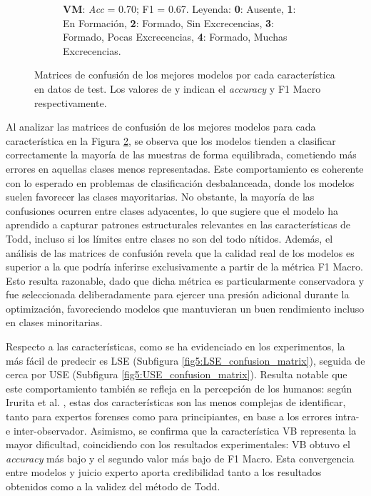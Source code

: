 \begin{figure}[htbp]
\begin{subfigure}[t]{0.3\textwidth}
        \caption{\textbf{VM}: \textit{Acc} = 0.70; F1 = 0.67. Leyenda: \textbf{0}: Ausente, \textbf{1}: En Formación, \textbf{2}: Formado, Sin Excrecencias, \textbf{3}: Formado, Pocas Excrecencias, \textbf{4}: Formado, Muchas Excrecencias.}
        \label{fig5:VM_confusion_matrix}
    \end{subfigure}  
    \caption[Matrices de confusión de los mejores modelos en datos de test]{Matrices de confusión de los mejores modelos por cada característica en datos de test. Los valores de  y  indican el \textit{accuracy} y F1 Macro respectivamente.}
    \label{conf_matrices}
\end{figure}


Al analizar las matrices de confusión de los mejores modelos para cada característica en la Figura \ref{conf_matrices}, se observa que los modelos tienden a clasificar correctamente la mayoría de las muestras de forma equilibrada, cometiendo más errores en aquellas clases menos representadas. Este comportamiento es coherente con lo esperado en problemas de clasificación desbalanceada, donde los modelos suelen favorecer las clases mayoritarias. No obstante, la mayoría de las confusiones ocurren entre clases adyacentes, lo que sugiere que el modelo ha aprendido a capturar patrones estructurales relevantes en las características de Todd, incluso si los límites entre clases no son del todo nítidos. Además, el análisis de las matrices de confusión revela que la calidad real de los modelos es superior a la que podría inferirse exclusivamente a partir de la métrica F1 Macro. Esto resulta razonable, dado que dicha métrica es particularmente conservadora y fue seleccionada deliberadamente para ejercer una presión adicional durante la optimización, favoreciendo modelos que mantuvieran un buen rendimiento incluso en clases minoritarias.

Respecto a las características, como se ha evidenciado en los experimentos, la más fácil de predecir es LSE (Subfigura \ref{fig5:LSE_confusion_matrix}), seguida de cerca por USE (Subfigura \ref{fig5:USE_confusion_matrix}). Resulta notable que este comportamiento también se refleja en la percepción de los humanos: según Irurita et al. \cite{irurita2025pubic}, estas dos características son las menos complejas de identificar, tanto para expertos forenses como para principiantes, en base a los errores intra- e inter-observador. Asimismo, se confirma que la característica VB representa la mayor dificultad, coincidiendo con los resultados experimentales: VB obtuvo el \textit{accuracy} más bajo y el segundo valor más bajo de F1 Macro. Esta convergencia entre modelos y juicio experto aporta credibilidad tanto a los resultados obtenidos como a la validez del método de Todd.

